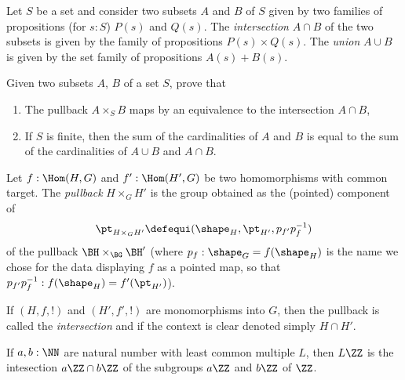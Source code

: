 \begin{definition}
  \label{def:intersectionand unionofsets}
  Let $S$ be a set and consider two subsets $A$ and $B$ of $S$ given by two families of propositions (for $s:S$) $P(s)$ and $Q(s)$.  The \emph{intersection} $A\cap B$ of the two subsets is given by the family of propositions $P(s)\times Q(s)$.  The \emph{union} $A\cup B$ is given by the set family of propositions $A(s)+B(s)$.
\end{definition}
\begin{xca}
  \label{xca:intersectionpullbackofsets}
  Given two subsets $A$, $B$ of a set $S$, prove that
  \begin{enumerate}
  \item The pullback $A\times_SB$ maps by an equivalence to the intersection $A\cap B$,
  \item\label{xca:cardinalityintersectionunion}
    If $S$ is finite, then the sum of the cardinalities of $A$ and $B$ is equal to the sum of the cardinalities of $A\cup B$ and $A\cap B$.\qedhere
  \end{enumerate}
\end{xca} 

\begin{definition}
  \label{def:intersectionofgroups}
  Let $f:\Hom(H,G)$ and $f':\Hom(H',G)$ be two homomorphisms with common target.  The \emph{pullback} $H\times_GH'$ is the group obtained as the (pointed) component of
$$\pt_{H\times_GH'}\defequi(\shape_H,\pt_{H'},p_{f'}p_f^{-1})$$ of the pullback $\BH\times_{\BG}\BH'$ (where $p_f:\shape_G=f(\shape_H)$ is the name we chose for the data displaying $f$ as a pointed map, so that $p_{f'}p_f^{-1}:f(\shape_H)=f'(\pt_{H'})$).

If $(H,f,!)$ and $(H',f',!)$ are monomorphisms into $G$, then the pullback is called the \emph{intersection} and if the context is clear denoted simply $H\cap H'$.
\end{definition}
\begin{example}
  If $a,b:\NN$ are natural number with least common multiple $L$, then $L\ZZ$ is the intesection $a\ZZ\cap b\ZZ$ of the subgroups $a\ZZ$ and $b\ZZ$ of $\ZZ$.
\end{example}


